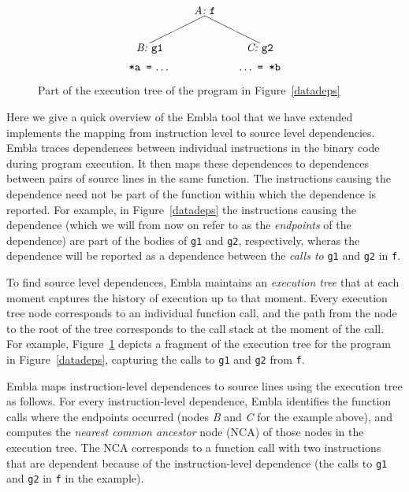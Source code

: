 \begin{figure} \small
\hrulefill
\[
\begin{picture}(160,60)(70,15)
\put(120,65){\makebox(60,10)[c]{\it A:\ \tt f}}
\put(150,65){\line(-2,-1){50}}
\put(150,65){\line( 2,-1){50}}
\put(170,30){\makebox(60,10)[c]{\it C:\ \tt g2}}
\put(70,30){\makebox(60,10)[c]{\it B:\ \tt g1}}
\put(70,15){\makebox(60,10)[cb]{{\tt *a\ =}\ \ldots}}
\put(170,15){\makebox(60,10)[cb]{\ldots\ {\tt =\ *b}}}
\end{picture}
\]
\hrulefill
\caption{Part of the execution tree of the program in Figure~\ref{datadeps}
} 
\label{ffextree}
\end{figure}

Here we give a quick overview of the Embla tool that we have extended
implements the mapping from instruction level to source level dependencies.
Embla traces dependences between individual instructions in the binary
code during program execution. It then maps these dependences to 
dependences between pairs of source lines in the same function. The
instructions causing the dependence need not be part of the function 
within which the dependence is reported. For example, in 
Figure~\ref{datadeps} the instructions causing the dependence (which we
will from now on refer to as the {\em endpoints} of the dependence) 
are part of the bodies of {\tt g1} and {\tt g2}, respectively, wheras the dependence 
will be reported as a dependence between the {\em calls to} {\tt g1} and 
{\tt g2} in {\tt f}.

To find source level dependences, Embla maintains an {\em execution tree} 
that at each moment captures 
the history of execution up to that moment. Every execution tree node 
corresponds to an
individual function call, and the path from the node to the root of the
tree corresponds to the call stack at the moment of the call. For
example, Figure~\ref{ffextree} depicts a fragment of the execution tree
for the program in Figure~\ref{datadeps}, capturing the calls to {\tt g1} 
and {\tt g2} from {\tt f}.

Embla maps instruction-level dependences to source lines
 using the execution tree as follows. For
every instruction-level dependence, Embla identifies the function calls
where the endpoints occurred (nodes {\it B} and {\it C} for the example
above), and computes the {\em nearest common ancestor} node (NCA) of
those nodes in the execution tree. The NCA corresponds to a function
call with two instructions that are dependent because of
the instruction-level dependence (the calls to {\tt g1} and {\tt g2} in 
{\tt f} in the example).

